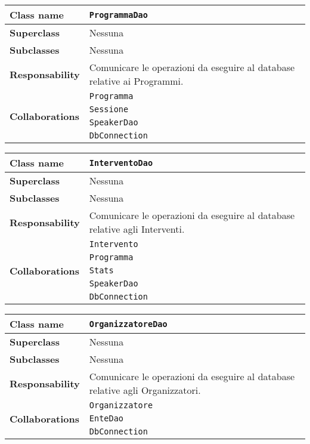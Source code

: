 \begin{table}[h!]
	\begin{tabular}{|l|l|}
		\hline 
		\textbf{Class name} & \texttt{ProgrammaDao}
		\\ \hline
		\textbf{Superclass} & Nessuna
		\\ \hline
		\multirow{1}{*}{\textbf{Subclasses}} & Nessuna
		\\ \hline
		\textbf{Responsability} & Comunicare le operazioni da eseguire al database relative ai Programmi.
		\\ \hline
		\multirow{4}{*}{\textbf{Collaborations}} & \texttt{Programma} \\ 
		& \texttt{Sessione} \\
		& \texttt{SpeakerDao} \\
		& \texttt{DbConnection} \\ \hline
	\end{tabular}
\end{table}

\begin{table}[h!]
	\begin{tabular}{|l|l|}
		\hline 
		\textbf{Class name} & \texttt{InterventoDao}
		\\ \hline
		\textbf{Superclass} & Nessuna
		\\ \hline
		\multirow{1}{*}{\textbf{Subclasses}} & Nessuna
		\\ \hline
		\textbf{Responsability} & Comunicare le operazioni da eseguire al database relative agli Interventi.
		\\ \hline
		\multirow{5}{*}{\textbf{Collaborations}} & \texttt{Intervento} \\ 
		& \texttt{Programma} \\
		& \texttt{Stats} \\
		& \texttt{SpeakerDao} \\
		& \texttt{DbConnection} \\ \hline
	\end{tabular}
\end{table}

\begin{table}[h!]
	\begin{tabular}{|l|l|}
		\hline 
		\textbf{Class name} & \texttt{OrganizzatoreDao}
		\\ \hline
		\textbf{Superclass} & Nessuna
		\\ \hline
		\multirow{1}{*}{\textbf{Subclasses}} & Nessuna
		\\ \hline
		\textbf{Responsability} & Comunicare le operazioni da eseguire al database relative agli Organizzatori.
		\\ \hline
		\multirow{3}{*}{\textbf{Collaborations}} & \texttt{Organizzatore} \\ 
		& \texttt{EnteDao} \\
		& \texttt{DbConnection} \\ \hline
	\end{tabular}
\end{table}

